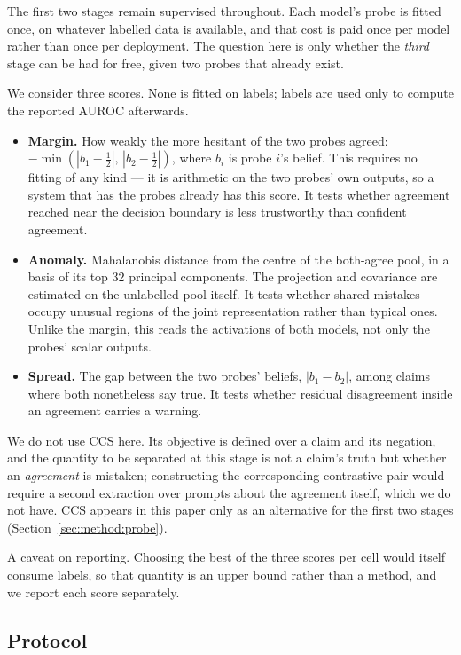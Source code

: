 The first two stages remain supervised throughout. Each model's probe is fitted
once, on whatever labelled data is available, and that cost is paid once per
model rather than once per deployment. The question here is only whether the
\emph{third} stage can be had for free, given two probes that already exist.

We consider three scores. None is fitted on labels; labels are used only to
compute the reported AUROC afterwards.

\begin{itemize}
\itemsep0em
\item \textbf{Margin.} How weakly the more hesitant of the two probes agreed:
  $-\min(|b_1 - \tfrac12|,\, |b_2 - \tfrac12|)$, where $b_i$ is probe $i$'s
  belief. This requires no fitting of any kind --- it is arithmetic on the two
  probes' own outputs, so a system that has the probes already has this score.
  It tests whether agreement reached near the decision boundary is less
  trustworthy than confident agreement.
\item \textbf{Anomaly.} Mahalanobis distance from the centre of the
  both-agree pool, in a basis of its top $32$ principal components. The
  projection and covariance are estimated on the unlabelled pool itself. It
  tests whether shared mistakes occupy unusual regions of the joint
  representation rather than typical ones. Unlike the margin, this reads the
  activations of both models, not only the probes' scalar outputs.
\item \textbf{Spread.} The gap between the two probes' beliefs,
  $|b_1 - b_2|$, among claims where both nonetheless say true. It tests whether
  residual disagreement inside an agreement carries a warning.
\end{itemize}

We do not use CCS here. Its objective is defined over a claim and its negation,
and the quantity to be separated at this stage is not a claim's truth but
whether an \emph{agreement} is mistaken; constructing the corresponding
contrastive pair would require a second extraction over prompts about the
agreement itself, which we do not have. CCS appears in this paper only as an
alternative for the first two stages (Section~\ref{sec:method:probe}).

A caveat on reporting. Choosing the best of the three scores per cell would
itself consume labels, so that quantity is an upper bound rather than a method,
and we report each score separately.

\subsection{Protocol}
\label{sec:method:protocol}

